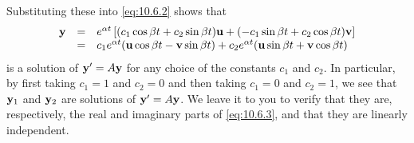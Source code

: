 \documentclass{ximera}
\begin{document}
Substituting these into \eqref{eq:10.6.2} shows that
\begin{equation} \label{eq:10.6.5}
\begin{array}{rcl}
{\bf y}&=&e^{\alpha t}\left[(c_1\cos\beta t+c_2\sin\beta t){\bf u}
+(-c_1\sin\beta t+c_2\cos\beta t){\bf v}\right]\\
&=&c_1e^{\alpha t}({\bf u}\cos\beta t-{\bf v}\sin\beta t)
+c_2e^{\alpha t}({\bf u}\sin\beta t+{\bf v}\cos\beta t)
\end{array}
\end{equation}
is a solution of ${\bf y}'=A{\bf y}$ for any choice of the constants
$c_1$ and $c_2$. In particular, by first taking $c_1=1$ and $c_2=0$
and then taking $c_1=0$ and $c_2=1$, we see that ${\bf y}_1$ and ${\bf
y}_2$ are solutions of $ {\bf y}'=A{\bf y}$. We leave it to you to
verify that they are, respectively, the real and imaginary parts of
\eqref{eq:10.6.3}, %
and that they are linearly
independent. %
\end{document}
